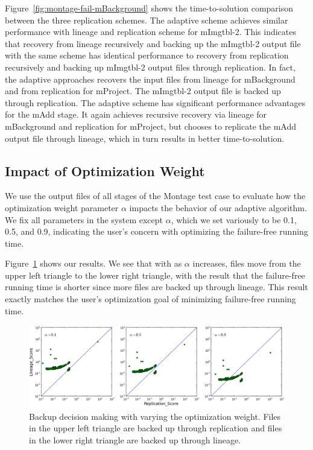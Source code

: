 \documentclass{sig-alternate}
\begin{document}
Figure~\ref{fig:montage-fail-mBackground} shows the time-to-solution comparison between the three replication schemes. 
The adaptive scheme achieves similar performance with lineage and replication scheme for mImgtbl-2. 
This indicates that recovery from lineage recursively and backing up the mImgtbl-2 output file with the same scheme has identical performance to recovery from replication recursively and backing up mImgtbl-2 output files through replication. 
In fact, the adaptive approaches recovers the input files from lineage for mBackground and from replication for mProject. The mImgtbl-2 output file is backed up through replication.
The adaptive scheme has significant performance advantages for the mAdd stage.
It again achieves recursive recovery via lineage for mBackground and replication for mProject,
but chooses to replicate the mAdd output file through lineage, which in turn results in better time-to-solution.



\subsection{Impact of Optimization Weight}
\label{sec:Perf:Weight}
We use the output files of all stages of the Montage test case to evaluate how the optimization weight parameter $\alpha$ impacts the behavior of our adaptive algorithm.
We fix all parameters in the system except $\alpha$, which we set variously to be 0.1, 0.5, and 0.9, indicating the user's concern with optimizing the failure-free running time.


Figure~\ref{fig:weight} shows our results. We see that with as $\alpha$ increases, files move from the upper left triangle to the lower right triangle, with the result that the failure-free running time is shorter since more files are backed up through lineage.
This result exactly matches the user's optimization goal of minimizing failure-free running time.

\begin{figure}[ht]
	\begin{center}
		\includegraphics[width=160mm]{pictures/weight}
		\vspace{-10pt}
		\caption{Backup decision making with varying the optimization weight. Files in the upper left triangle are backed up through replication and files in the lower right triangle are backed up through lineage.
		\label{fig:weight}}
  	\end{center}
\end{figure}
\end{document}
